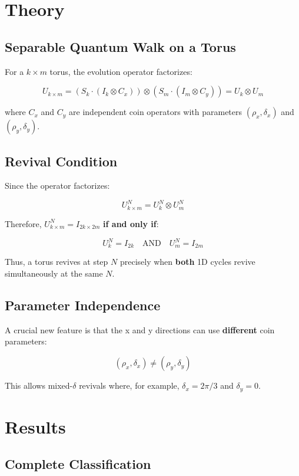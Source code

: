 \documentclass[12pt]{article}
\begin{document}
\section{Theory}

\subsection{Separable Quantum Walk on a Torus}

For a \(k \times m\) torus, the evolution operator factorizes:

\[
U_{k \times m} = (S_k \cdot (I_k \otimes C_x)) \otimes (S_m \cdot (I_m \otimes C_y)) = U_k \otimes U_m
\]

where \(C_x\) and \(C_y\) are independent coin operators with parameters \((\rho_x, \delta_x)\) and \((\rho_y, \delta_y)\).

\subsection{Revival Condition}

Since the operator factorizes:

\[
U_{k \times m}^N = U_k^N \otimes U_m^N
\]

Therefore, \(U_{k \times m}^N = I_{2k \times 2m}\) \textbf{if and only if}:

\[
U_k^N = I_{2k} \quad \text{AND} \quad U_m^N = I_{2m}
\]

Thus, a torus revives at step \(N\) precisely when \textbf{both} 1D cycles revive simultaneously at the same \(N\).

\subsection{Parameter Independence}

A crucial new feature is that the x and y directions can use \textbf{different} coin parameters:

\[
(\rho_x, \delta_x) \neq (\rho_y, \delta_y)
\]

This allows mixed-\(\delta\) revivals where, for example, \(\delta_x = 2\pi/3\) and \(\delta_y = 0\).

\section{Results}

\subsection{Complete Classification}
\end{document}
